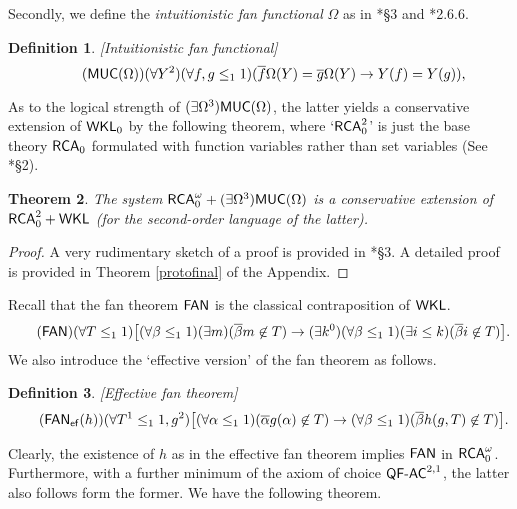 \documentclass[reqno]{amsart}
\newtheorem{thm}{Theorem}
\newtheorem{defi}[thm]{Definition}
\newcommand\be{\begin{equation}}
\newcommand\ee{\end{equation}}
\def\bdefi{\begin{defi}\rm}
\def\edefi{\end{defi}}
\def\FAN{\textup{\textsf{FAN}}}
\def\ef{\textup{\textsf{ef}}}
\def\RCA{\textup{\textsf{RCA}}}
\def\({\textup{(}}
\def\){\textup{)}}
\def\RCAo{\textup{\textsf{RCA}}_{0}^{\omega}}
\def\WKL{\textup{\textsf{WKL}}}
\def\FAN{\textup{\textsf{FAN}}}
\def\MUC{\textup{\textsf{MUC}}}
\def\di{\rightarrow}
\def\QFAC{\textup{\textsf{QF-AC}}}
\numberwithin{equation}{section}
\numberwithin{thm}{section}
\begin{document}
Secondly, we define the \emph{intuitionistic fan functional} $\Omega$ as in \cite{kohlenbach2}*{\S3} and \cite{troelstra1}*{2.6.6}.  
\bdefi[Intuitionistic fan functional]\label{into}
\be\tag{$\MUC(\Omega)$}
(\forall Y^{2}) (\forall f, g\leq_{1}1)(\overline{f}\Omega(Y)=\overline{g}\Omega(Y)\notag \di Y(f)=Y(g)),   %
\ee
\edefi
As to the logical strength of $(\exists \Omega^{3})\MUC(\Omega)$, the latter yields a conservative extension of $\WKL_{0}$ by the following theorem, where `$\RCA_{0}^{2}$' is just the base theory $\RCA_{0}$ formulated with function variables rather than set variables (See \cite{kohlenbach2}*{\S2}).  
\begin{thm}\label{proto}
The system $\RCA_{0}^{\omega}+(\exists \Omega^{3})\MUC(\Omega)$ is a conservative extension of $\RCA_{0}^{2}+\WKL$ \(for the second-order language of the latter\).  
\end{thm}
\begin{proof}
A very rudimentary sketch of a proof is provided in \cite{kohlenbach2}*{\S3}. 
A detailed proof is provided in Theorem \ref{protofinal} of the Appendix.  
\end{proof}
Recall that the fan theorem $\FAN$  is the classical contraposition of $\WKL$. 
\be\tag{$\FAN$}
(\forall T \leq_{1}1)\big[ (\forall \beta\leq_{1}1)(\exists m)(\overline{\beta}m\not \in T)\di (\exists k^{0})(\forall \beta\leq_{1}1)(\exists i\leq k)(\overline{\beta}i\not\in T) \big]. 
\ee
We also introduce the `effective version' of the fan theorem as follows.
\bdefi[Effective fan theorem]
\be\tag{$\FAN_{\ef}(h)$}
(\forall T^{1}\leq_{1}1, g^{2})\big[ (\forall \alpha\leq_{1}1)(\overline{\alpha}g(\alpha)\not\in T)\di (\forall \beta\leq_{1}1)(\overline{\beta}h(g, T)\not\in T)   \big].
\ee
\edefi
Clearly, the existence of $h$ as in the effective fan theorem implies $\FAN$ in $\RCAo$.  
Furthermore, with a further minimum of the axiom of choice $\QFAC^{2,1}$, the latter also follows form the former.  
We have the following theorem. 
\end{document}
